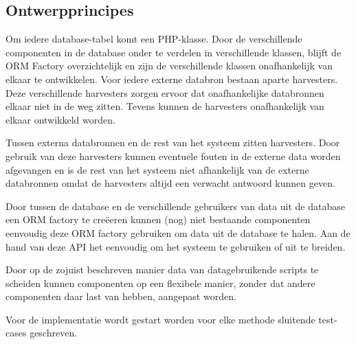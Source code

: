 \documentclass[a4paper,10pt]{article}
\begin{document}
	\subsection{Ontwerpprincipes}
		\begin{enumerate}
			Om iedere database-tabel komt een PHP-klasse. Door de verschillende componenten in de database onder te verdelen in verschillende klassen, blijft de ORM Factory overzichtelijk en zijn de verschillende klassen onafhankelijk van elkaar te ontwikkelen. Voor iedere externe databron bestaan aparte harvesters. Deze verschillende harvesters zorgen ervoor dat onafhankelijke databronnen elkaar niet in de weg zitten. Tevens kunnen de harvesters onafhankelijk van elkaar ontwikkeld worden.
					 	 	 		
Tussen externa databronnen en de rest van het systeem zitten harvesters. Door gebruik van deze harvesters kunnen eventuele fouten in de externe data worden afgevangen en is de rest van het systeem niet afhankelijk van de externe databronnen omdat de harvesters altijd een verwacht antwoord kunnen geven.

Door tussen de database en de verschillende gebruikers van data uit de database een ORM factory te cre\"eeren kunnen (nog) niet bestaande componenten eenvoudig deze ORM factory gebruiken om data uit de database te halen. Aan de hand van deze API het eenvoudig om het systeem te gebruiken of uit te breiden.

Door op de zojuist beschreven manier data van datagebruikende scripts te scheiden kunnen componenten op een flexibele manier, zonder dat andere componenten daar last van hebben, aangepast worden.

Voor de implementatie wordt gestart worden voor elke methode sluitende test-cases geschreven.
		\end{enumerate}
\end{document}
